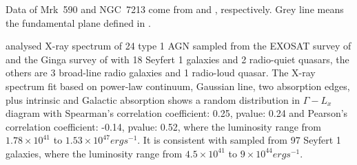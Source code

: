 Data of Mrk~590 and NGC~7213 come from \citet{2016MNRAS.460..304K} and \citet{2011MNRAS.411..402B}, respectively. Grey line means the fundamental plane defined in \citet{2003MNRAS.345.1057M}.





\citet{1997MNRAS.286..513R} analysed X-ray spectrum of 24 type 1 AGN sampled from the EXOSAT survey of \citet{1989MNRAS.240..833T} and the Ginga survey of \citet{1994MNRAS.268..405N} with 18 Seyfert 1 galaxies and 2 radio-quiet quasars, the others are 3 broad-line radio galaxies and 1 radio-loud quasar. The X-ray spectrum fit based on power-law continuum, Gaussian line, two absorption edges, plus intrinsic and Galactic absorption shows a random distribution in $\Gamma-L_x$ diagram with Spearman's correlation coefficient: 0.25, pvalue: 0.24 and Pearson's correlation coefficient: -0.14, pvalue: 0.52, where the luminosity range from $1.78\times 10^{41}$ to $1.53\times 10^{47} erg s^{-1}$. It is consistent with \citet{2015AASP....5...79S} sampled from 97 Seyfert 1 galaxies, where the luminosity range from $4.5\times 10^{41}$ to $9\times 10^{44} erg s^{-1}$. 


